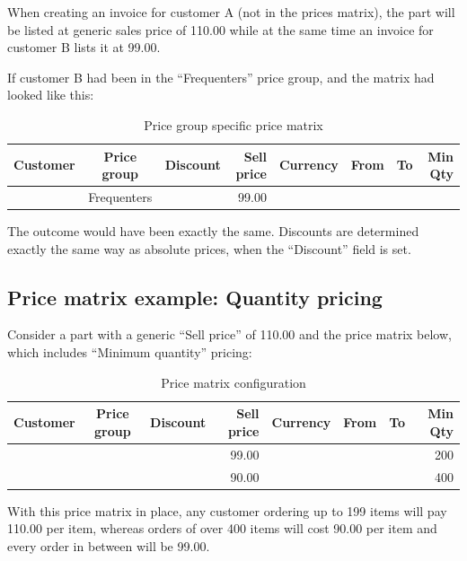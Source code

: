 
When creating an invoice for customer A (not in the prices matrix), the part will be listed at generic sales price of 110.00 while at the
same time an invoice for customer B lists it at 99.00.

If customer B had been in the ``Frequenters'' price group, and the matrix had looked like this:

\begin{table}[H]
	\caption{Price group specific price matrix}
	\begin{tabular}{|ccrrcrrr|}
		\hline
		\bf Customer & \bf Price group & \bf Discount &  \bf Sell price & \bf Currency & \bf From & \bf To & \bf Min Qty \\
		\hline
		 & Frequenters & & 99.00 & & & & \\
		\hline
	\end{tabular}
\end{table}

The outcome would have been exactly the same. Discounts are determined exactly the same way
as absolute prices, when the ``Discount'' field is set.


\subsection{Price matrix example: Quantity pricing}

Consider a part with a generic ``Sell price'' of 110.00 and the price matrix below, which includes
``Minimum quantity'' pricing:

\begin{table}[H]
	\caption{Price matrix configuration}
	\begin{tabular}{|ccrrcrrr|}
		\hline
		\bf Customer & \bf Price group & \bf Discount &  \bf Sell price & \bf Currency & \bf From & \bf To & \bf Min Qty \\
		\hline
		 & & & 99.00 & & & & 200 \\
		\hline
         & & & 90.00 & & & & 400 \\
		\hline
	\end{tabular}
\end{table}

With this price matrix in place, any customer ordering up to 199 items will pay 110.00 per item, whereas orders of over
400 items will cost 90.00 per item and every order in between will be 99.00.

